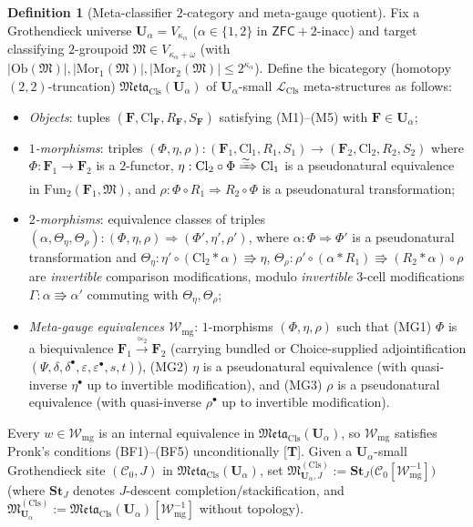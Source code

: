 \documentclass[11pt]{article}
\theoremstyle{plain}
\theoremstyle{definition}
\newtheorem{definition}[theorem]{Definition}
\newcommand{\cC}{\mathcal{C}}
\newcommand{\fM}{\mathfrak{M}}
\newcommand{\Meta}{\mathfrak{Meta}}
\newcommand{\LCls}{\mathcal{L}_{\mathrm{Cls}}}
\newcommand{\Ob}{\mathrm{Ob}}
\newcommand{\Mor}{\mathrm{Mor}}
\newcommand{\Fun}{\mathrm{Fun}}
\newcommand{\Cl}{\mathrm{Cl}}
\newcommand{\ZFC}{\mathsf{ZFC}}
\begin{document}
\begin{definition}[Meta-classifier $2$-category and meta-gauge quotient]\label{def:meta-gauge-quotient}
Fix a Grothendieck universe $\mathbf{U}_\alpha = V_{\kappa_\alpha}$ ($\alpha \in \{1, 2\}$ in $\ZFC + 2\text{-inacc}$) and target classifying $2$-groupoid $\fM \in V_{\kappa_\alpha + \omega}$ (with $|\Ob(\fM)|, |\Mor_1(\fM)|, |\Mor_2(\fM)| \le 2^{\kappa_\alpha}$). Define the bicategory (homotopy $(2,2)$-truncation) $\Meta_{\mathrm{Cls}}(\mathbf{U}_\alpha)$ of $\mathbf{U}_\alpha$-small $\LCls$ meta-structures as follows:
\begin{itemize}[nosep]
\item \emph{Objects}: tuples $(\mathbf{F}, \Cl_{\mathbf{F}}, R_{\mathbf{F}}, S_{\mathbf{F}})$ satisfying \textup{(M1)--(M5)} with $\mathbf{F} \in \mathbf{U}_\alpha$;
\item \emph{$1$-morphisms}: triples $(\Phi, \eta, \rho) : (\mathbf{F}_1, \Cl_1, R_1, S_1) \to (\mathbf{F}_2, \Cl_2, R_2, S_2)$ where $\Phi : \mathbf{F}_1 \to \mathbf{F}_2$ is a $2$-functor, $\eta : \Cl_2 \circ \Phi \xRightarrow{\simeq} \Cl_1$ is a pseudonatural equivalence in $\Fun_2(\mathbf{F}_1, \fM)$, and $\rho : \Phi \circ R_1 \Rightarrow R_2 \circ \Phi$ is a pseudonatural transformation;
\item \emph{$2$-morphisms}: equivalence classes of triples $(\alpha, \Theta_\eta, \Theta_\rho) : (\Phi, \eta, \rho) \Rightarrow (\Phi', \eta', \rho')$, where $\alpha : \Phi \Rightarrow \Phi'$ is a pseudonatural transformation and $\Theta_\eta : \eta' \circ (\Cl_2 * \alpha) \Rrightarrow \eta$, $\Theta_\rho : \rho' \circ (\alpha * R_1) \Rrightarrow (R_2 * \alpha) \circ \rho$ are \emph{invertible} comparison modifications, modulo \emph{invertible} $3$-cell modifications $\Gamma : \alpha \Rrightarrow \alpha'$ commuting with $\Theta_\eta, \Theta_\rho$;
\item \emph{Meta-gauge equivalences $\mathcal{W}_{\mathrm{mg}}$}: $1$-morphisms $(\Phi, \eta, \rho)$ such that \textup{(MG1)} $\Phi$ is a biequivalence $\mathbf{F}_1 \xrightarrow{\simeq_2} \mathbf{F}_2$ (carrying bundled or Choice-supplied adjointification $(\Psi, \delta, \delta^\bullet, \varepsilon, \varepsilon^\bullet, s, t)$), \textup{(MG2)} $\eta$ is a pseudonatural equivalence (with quasi-inverse $\eta^\bullet$ up to invertible modification), and \textup{(MG3)} $\rho$ is a pseudonatural equivalence (with quasi-inverse $\rho^\bullet$ up to invertible modification).
\end{itemize}
Every $w \in \mathcal{W}_{\mathrm{mg}}$ is an internal equivalence in $\Meta_{\mathrm{Cls}}(\mathbf{U}_\alpha)$, so $\mathcal{W}_{\mathrm{mg}}$ satisfies Pronk's conditions \textup{(BF1)--(BF5)} unconditionally \textup{[\textbf{T}]}. Given a $\mathbf{U}_\alpha$-small Grothendieck site $(\cC_0, J)$ in $\Meta_{\mathrm{Cls}}(\mathbf{U}_\alpha)$, set $\fM^{(\mathrm{Cls})}_{\mathbf{U}_\alpha, J} := \mathbf{St}_J\bigl(\cC_0[\mathcal{W}_{\mathrm{mg}}^{-1}]\bigr)$ (where $\mathbf{St}_J$ denotes $J$-descent completion/stackification, and $\fM^{(\mathrm{Cls})}_{\mathbf{U}_\alpha} := \Meta_{\mathrm{Cls}}(\mathbf{U}_\alpha)[\mathcal{W}_{\mathrm{mg}}^{-1}]$ without topology).
\end{definition}
\end{document}
